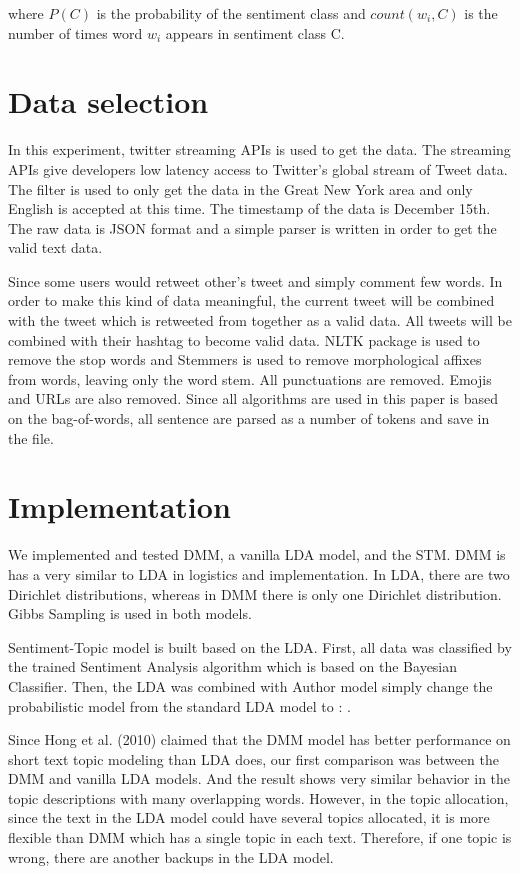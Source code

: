 \documentclass[12pt]{amsart}
\newcommand{\0}{\mat{0}}
\newcommand{\1}{\mathds{1}}
\begin{document}
where $P(C)$ is the probability of the sentiment class and $count(w_i,C)$ is the number of times word $w_i$ appears in sentiment class C. 

\section{Data selection}

In this experiment, twitter streaming APIs is used to get the data. The streaming APIs give developers low latency access to Twitter's global stream of Tweet data. The filter is used to only get the data in the Great New York area and only English is accepted at this time. The timestamp of the data is December 15th. The raw data is JSON format and a simple parser is written in order to get the valid text data. 

Since some users would retweet other's tweet and simply comment few words. In order to make this kind of data meaningful, the current tweet will be combined with the tweet which is retweeted from together as a valid data. All tweets will be combined with their hashtag to become valid data. NLTK package is used to remove the stop words and Stemmers is used to remove morphological affixes from words, leaving only the word stem. All punctuations are removed. Emojis and URLs are also removed. Since all algorithms are used in this paper is based on the bag-of-words, all sentence are parsed as a number of tokens and save in the file.

\section{Implementation}

We implemented and tested DMM, a vanilla LDA model, and the STM.  DMM is has a very similar to LDA in logistics and implementation.  In LDA, there are two Dirichlet distributions, whereas in DMM there is only one Dirichlet distribution. Gibbs Sampling is used in both models.

Sentiment-Topic model is built based on the LDA. First, all data was classified by the trained Sentiment Analysis algorithm which is based on the Bayesian Classifier. Then, the LDA was combined with Author model simply change the probabilistic model from the standard LDA model to :                 .

Since Hong et al. (2010) claimed that the DMM model has better performance on short text topic modeling than LDA does, our first comparison was between the DMM and vanilla LDA models. And the result shows very similar behavior in the topic descriptions with many overlapping words. However, in the topic allocation, since the text in the LDA model could have several topics allocated, it is more flexible than DMM which has a single topic in each text. Therefore, if one topic is wrong, there are another backups in the LDA model.
\end{document}
